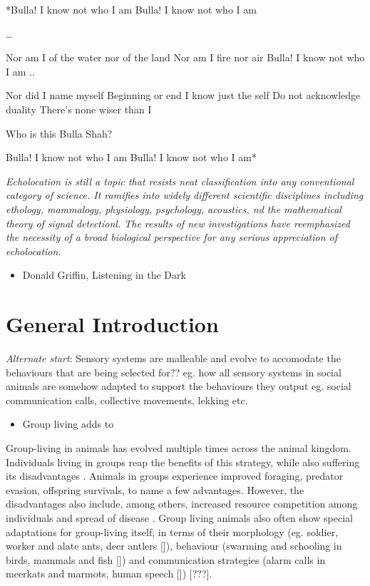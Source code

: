 \documentclass[
]{book}
\providecommand{\tightlist}{%
  \setlength{\itemsep}{0pt}\setlength{\parskip}{0pt}}
\begin{document}
*Bulla! I know not who I am
Bulla! I know not who I am

\ldots{}

Nor am I of the water nor of the land
Nor am I fire nor air
Bulla! I know not who I am
..

Nor did I name myself
Beginning or end I know just the self
Do not acknowledge duality
There's none wiser than I

Who is this Bulla Shah?

Bulla! I know not who I am
Bulla! I know not who I am*

\emph{Echolocation is still a topic that resists neat classification into any conventional category of science. It ramifies into widely different scientific disciplines including ethology, mammalogy, physiology, psychology, acoustics, nd the mathematical theory of signal detectionl. The results of new investigations have reemphasized the necessity of a broad biological perspective for any serious appreciation of echolocation.}

\begin{itemize}
\tightlist
\item
  Donald Griffin, Listening in the Dark
\end{itemize}

\newpage

\hypertarget{general-introduction}{%
\chapter{General Introduction}\label{general-introduction}}

\emph{Alternate start}: Sensory systems are malleable and evolve to accomodate the behaviours that are being selected for?? eg. how all sensory systems in social animals are somehow adapted to support the behaviours they output eg. social communication calls, collective movements, lekking etc.

\begin{itemize}
\tightlist
\item
  Group living adds to
\end{itemize}

Group-living in animals has evolved multiple times across the animal kingdom. Individuals living in groups reap the benefits of this strategy, while also suffering its disadvantages \citep[?]{Krebs}. Animals in groups experience improved foraging, predator evasion, offspring survivals, to name a few advantages. However, the disadvantages also include, among others, increased resource competition among individuals and spread of disease \citep[?]{Krebs}. Group living animals also often show special adaptations for group-living itself, in terms of their morphology (eg. soldier, worker and alate ants, deer antlers {[}{]}), behaviour (swarming and schooling in birds, mammals and fish {[}{]}) and communication strategies (alarm calls in meerkats and marmots, human speech {[}{]}) {[}???{]}.
\end{document}
